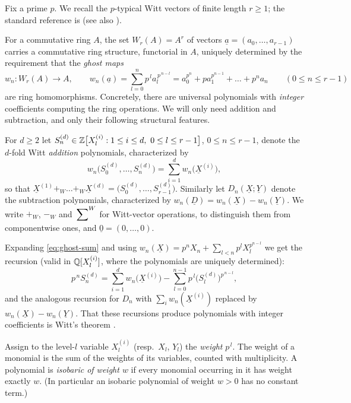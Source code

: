 \documentclass[11pt]{article}
\newcommand{\wv}[1]{\underline{#1}}                 %
\newcommand{\Wsum}{\sideset{}{^{W}}\sum}            %
\begin{document}
Fix a prime $p$.  We recall the $p$-typical Witt vectors of finite length
$r\ge 1$; the standard reference is \cite[II \S6]{serreLF} (see also
\cite{Rabinoff2014Witt}).

For a commutative ring $A$, the set $W_r(A)=A^r$ of vectors
$\wv a=(a_0,\dots,a_{r-1})$ carries a commutative ring structure, functorial
in $A$, uniquely determined by the requirement that the \emph{ghost maps}
\[
w_n\colon W_r(A)\longrightarrow A,\qquad
w_n(\wv a)=\sum_{l=0}^{n}p^{\,l}a_l^{\,p^{\,n-l}}
=a_0^{p^n}+pa_1^{p^{n-1}}+\dots+p^na_n
\qquad(0\le n\le r-1)
\]
are ring homomorphisms.  Concretely, there are universal polynomials with
\emph{integer} coefficients computing the ring operations.  We will only
need addition and subtraction, and only their following structural features.

\begin{notation*}
For $d\ge2$ let
$S^{(d)}_n\in\mathbb{Z}\big[X^{(i)}_l : 1\le i\le d,\ 0\le l\le r-1\big]$,
$0\le n\le r-1$, denote the $d$-fold Witt \emph{addition} polynomials,
characterized by
\begin{equation}\label{eq:ghost-sum}
w_n\big(S^{(d)}_0,\dots,S^{(d)}_{n}\big)
=\sum_{i=1}^{d}w_n\big(\wv X^{(i)}\big),
\end{equation}
so that
$\wv X^{(1)}+_W\dots+_W\wv X^{(d)}
=\big(S^{(d)}_0,\dots,S^{(d)}_{r-1}\big)$.
Similarly let $D_n(\wv X;\wv Y)$ denote the subtraction polynomials,
characterized by $w_n(\wv D)=w_n(\wv X)-w_n(\wv Y)$.
We write $+_W$, $-_W$ and $\Wsum$ for Witt-vector operations, to
distinguish them from componentwise ones, and $\wv 0=(0,\dots,0)$.
\end{notation*}

Expanding \cref{eq:ghost-sum} and using
$w_n(\wv X)=p^nX_n+\sum_{l<n}p^lX_l^{p^{n-l}}$ we get the recursion
(valid in $\mathbb{Q}[X^{(i)}_l]$, where the polynomials are uniquely determined):
\begin{equation}\label{eq:recursion}
p^{\,n}S^{(d)}_n
=\sum_{i=1}^{d}w_n\big(\wv X^{(i)}\big)
-\sum_{l=0}^{n-1}p^{\,l}\big(S^{(d)}_l\big)^{p^{\,n-l}},
\end{equation}
and the analogous recursion for $D_n$ with
$\sum_i w_n(\wv X^{(i)})$ replaced by $w_n(\wv X)-w_n(\wv Y)$.
That these recursions produce polynomials with integer coefficients is
Witt's theorem \cite[II \S6, Thm.~6]{serreLF}.

\begin{definition}[weights]\label{def:weight}
Assign to the level-$l$ variable $X^{(i)}_l$ (resp.\ $X_l$, $Y_l$) the
\emph{weight} $p^{\,l}$.  The weight of a monomial is the sum of the weights
of its variables, counted with multiplicity.  A polynomial is
\emph{isobaric of weight $w$} if every monomial occurring in it has weight
exactly $w$.  (In particular an isobaric polynomial of weight $w>0$ has no
constant term.)
\end{definition}
\end{document}
